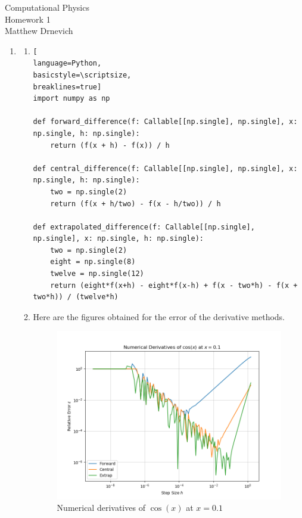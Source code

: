 \documentclass[11pt]{article}
\theoremstyle{theorem}
\theoremstyle{definition}
\theoremstyle{remark}
\begin{document}
\begin{center}
{\LARGE Computational Physics} \\
{\Large Homework 1} \\
\vspace{4mm}
{\Large Matthew Drnevich}
\end{center}

\begin{enumerate}
\item\begin{enumerate}
    \item\begin{lstlisting}[
language=Python,
basicstyle=\scriptsize,
breaklines=true]
import numpy as np

def forward_difference(f: Callable[[np.single], np.single], x: np.single, h: np.single):
    return (f(x + h) - f(x)) / h
    
def central_difference(f: Callable[[np.single], np.single], x: np.single, h: np.single):
    two = np.single(2)
    return (f(x + h/two) - f(x - h/two)) / h
    
def extrapolated_difference(f: Callable[[np.single], np.single], x: np.single, h: np.single):
    two = np.single(2)
    eight = np.single(8)
    twelve = np.single(12)
    return (eight*f(x+h) - eight*f(x-h) + f(x - two*h) - f(x + two*h)) / (twelve*h)
\end{lstlisting}

    \item Here are the figures obtained for the error of the derivative methods.
    \begin{figure}[H]
        \centering
        \includegraphics[scale=0.65]{derivative1.png}
        \caption{Numerical derivatives of $\cos(x)$ at $x=0.1$}
        \label{fig:my_label}
    \end{figure}
    

\end{enumerate}
\end{enumerate}
\end{document}
